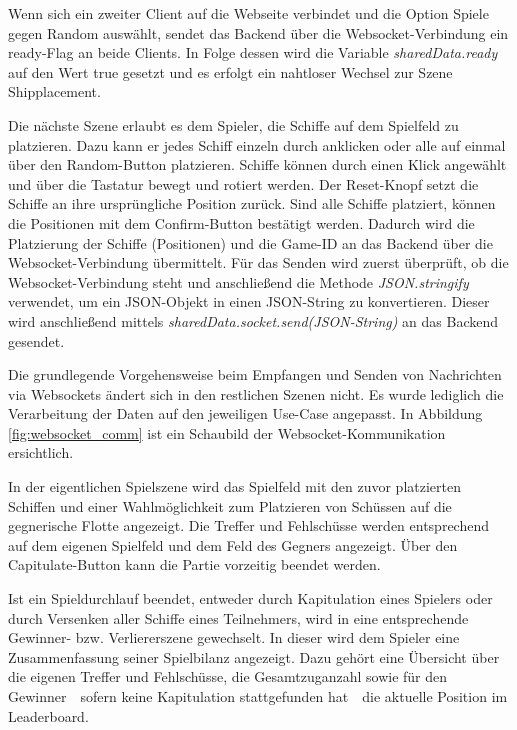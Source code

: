 \documentclass[a4paper, 10pt, conference]{IEEEtran}
\begin{document}
Wenn sich ein zweiter Client auf die Webseite verbindet und die Option \glqq Spiele gegen Random\grqq{} auswählt, sendet das Backend über die Websocket-Verbindung ein \glqq ready\grqq{}-Flag an beide Clients. In Folge dessen wird die Variable \textit{sharedData.ready} auf den Wert \glqq true\grqq{} gesetzt und es erfolgt ein nahtloser Wechsel zur Szene \glqq Shipplacement\grqq{}.

Die nächste Szene erlaubt es dem Spieler, die Schiffe auf dem Spielfeld zu platzieren. Dazu kann er jedes Schiff einzeln durch anklicken oder alle auf einmal über den Random-Button platzieren. Schiffe können durch einen Klick angewählt und über die Tastatur bewegt und rotiert werden. Der Reset-Knopf setzt die Schiffe an ihre ursprüngliche Position zurück. Sind alle Schiffe platziert, können die Positionen mit dem Confirm-Button bestätigt werden.
Dadurch wird die Platzierung der Schiffe (Positionen) und die Game-ID an das Backend über die Websocket-Verbindung übermittelt. Für das Senden wird zuerst überprüft, ob die Websocket-Verbindung steht und anschließend die Methode \textit{JSON.stringify} verwendet, um ein JSON-Objekt in einen JSON-String zu konvertieren. Dieser wird anschließend mittels \textit{sharedData.socket.send(JSON-String)} an das Backend gesendet.

Die grundlegende Vorgehensweise beim Empfangen und Senden von Nachrichten via Websockets ändert sich in den restlichen Szenen nicht. Es wurde lediglich die Verarbeitung der Daten auf den jeweiligen Use-Case angepasst. In Abbildung \ref{fig:websocket_comm} ist ein Schaubild der Websocket-Kommunikation ersichtlich.

In der eigentlichen Spielszene wird das Spielfeld mit den zuvor platzierten Schiffen und einer Wahlmöglichkeit zum Platzieren von Schüssen auf die gegnerische Flotte angezeigt. Die Treffer und Fehlschüsse werden entsprechend auf dem eigenen Spielfeld und dem Feld des Gegners angezeigt. Über den Capitulate-Button kann die Partie vorzeitig beendet werden. 

Ist ein Spieldurchlauf beendet, entweder durch Kapitulation eines Spielers oder durch Versenken aller Schiffe eines Teilnehmers, wird in eine entsprechende Gewinner- bzw. Verliererszene gewechselt. In dieser wird dem Spieler eine Zusammenfassung seiner Spielbilanz angezeigt. Dazu gehört eine Übersicht über die eigenen Treffer und Fehlschüsse, die Gesamtzuganzahl sowie für den Gewinner~\textendash~sofern keine Kapitulation stattgefunden hat~\textendash~die aktuelle Position im Leaderboard.
\end{document}
